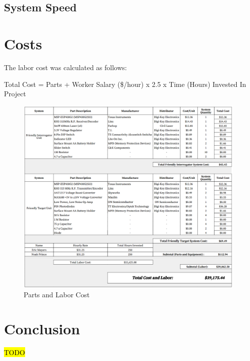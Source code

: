 \documentclass[letterpaper,10pt]{article}
\begin{document}
\begin{spacing}{1.15}
\subsection{System Speed}


\section{Costs}

The labor cost was calculated as follows:

\begin{center}
	Total Cost = Parts + Worker Salary (\$/hour) x 2.5 x Time (Hours) Invested In Project
\end{center}

\begin{figure} [H]
	\centering
	\includegraphics[scale=0.45]{parts-labor-cost.png}
	\caption{Parts and Labor Cost\label{fig:parts-labor-cost}}
\end{figure}



\section{Conclusion}
\hl{TODO}

\end{spacing}
\end{document}
